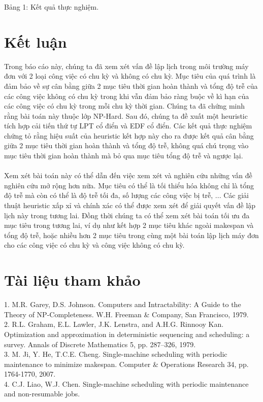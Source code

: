\documentclass[a4paper,12pt]{article}
\begin{document}
\begin{center}
Bảng 1: Kết quả thực nghiệm.\\
\end{center}
\section{Kết luận}
Trong báo cáo này, chúng ta đã xem xét vấn đề lập lịch trong môi trường máy đơn với 2 loại công việc có chu kỳ và không có chu kỳ. Mục tiêu của quá trình là đảm bảo về sự cân bằng giữa 2 mục tiêu thời gian hoàn thành và tổng độ trễ của các công việc không có chu kỳ trong khi vẫn đảm bảo ràng buộc về kì hạn của các công việc có chu kỳ trong mỗi chu kỳ thời gian. Chúng ta đã chứng minh rằng bài toán này thuộc lớp NP-Hard. Sau đó, chúng ta đề xuất một heuristic tích hợp cải tiến thứ tự LPT cổ điển và EDF cổ điển. Các kết quả thực nghiệm chứng tỏ rằng hiệu suất của heuristic kết hợp này cho ra được kết quả cân bằng giữa 2 mục tiêu thời gian hoàn thành và tổng độ trễ, không quá chú trọng vào mục tiêu thời gian hoàn thành mà bỏ qua mục tiêu tổng độ trễ và ngược lại.\\\\
Xem xét bài toán này có thể dẫn đến việc xem xét và nghiên cứu những vấn đề nghiên cứu mở rộng hơn nữa. Mục tiêu có thể là tối thiểu hóa không chỉ là tổng độ trễ mà còn có thể là độ trễ tối đa, số lượng các công việc bị trễ, ... Các giải thuật heuristic xấp xỉ và chính xác có thể được xem xét để giải quyết vấn đề lập lịch này trong tương lai. Đồng thời chúng ta có thể xem xét bài toán tối ưu đa mục tiêu trong tương lai, ví dụ như kết hợp 2 mục tiêu khác ngoài makespan và tổng độ trễ, hoặc nhiều hơn 2 mục tiêu trong cùng một bài toán lập lịch máy đơn cho các công việc có chu kỳ và công việc không có chu kỳ.
\section{Tài liệu tham khảo}
1.	M.R. Garey, D.S. Johnson. Computers and Intractability: A Guide to the Theory of NP-Completeness. W.H. Freeman \& Company, San Francisco, 1979.\\
2.	R.L. Graham, E.L. Lawler, J.K. Lenstra, and A.H.G. Rinnooy Kan. Optimization and approximation in deterministic sequencing and scheduling: a survey. Annals of Discrete Mathematics 5, pp. 287–326, 1979.\\
3.	M. Ji, Y. He, T.C.E. Cheng. Single-machine scheduling with periodic maintenance to minimize makespan. Computer \& Operations Research 34, pp. 1764-1770, 2007.\\
4.	C.J. Liao, W.J. Chen. Single-machine scheduling with periodic maintenance and non-resumable jobs.
\end{document}
